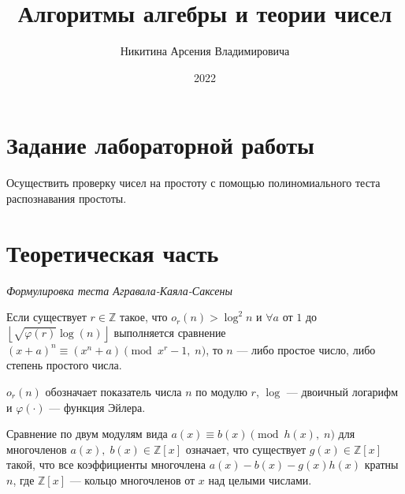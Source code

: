 \documentclass[bachelor, och, labwork]{shiza}
\begin{document}
\title{Алгоритмы алгебры и теории чисел}





\author{Никитина Арсения Владимировича}




\date{2022}

\maketitle



\tableofcontents

\section{Задание лабораторной работы}

Осуществить проверку чисел на простоту с помощью полиномиального теста 
распознавания простоты.

\section{Теоретическая часть}

\begin{center}
    \textit{Формулировка теста Агравала-Каяла-Саксены}
\end{center}

Если существует $r\in \mathbb {Z}$ такое, что $o_{r}(n)>\log ^{2}n$ и $\forall a$ 
от $1$ до $\left\lfloor {\sqrt {\varphi (r)}}\log(n)\right\rfloor$ выполняется 
сравнение $(x+a)^{n}\equiv (x^{n}+a){\pmod {x^{r}-1,\;n}}$,
то $n$ --- либо простое число, либо степень простого числа.

$o_{r}(n)$ обозначает показатель числа $n$ по модулю $r$, $\log$ --- двоичный 
логарифм и $\varphi (\cdot )$ --- функция Эйлера.

Сравнение по двум модулям вида $a(x)\equiv b(x){\pmod {h(x),\;n}}$ для многочленов 
$a(x),\;b(x)\in \mathbb {Z} [x]$ означает, что существует $g(x)\in \mathbb {Z} [x]$
такой, что все коэффициенты многочлена $a(x)-b(x)-g(x)h(x)$ кратны $n$, где 
$\mathbb {Z} [x]$ --- кольцо многочленов от $x$ над целыми числами.
\end{document}
